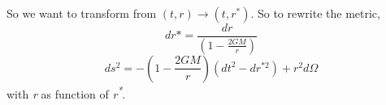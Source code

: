 So we want to transform from $\left( t,r \right) \to \left( t,r^{*} \right)$. 
So to rewrite the metric,
\[
dr* = \frac{dr}{\left( 1- \frac{2GM}{r} \right)}
\]
\begin{equation}
	ds^{2} = - \left(  1 - \frac{2GM}{r} \right)\left( dt^{2} - dr^{*2} \right) + r^{2}d\Omega 
\end{equation}
with \emph{r} as function of \emph{r\textsuperscript{*}}. 


















